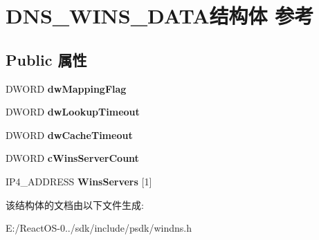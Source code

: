 \hypertarget{struct_d_n_s___w_i_n_s___d_a_t_a}{}\section{D\+N\+S\+\_\+\+W\+I\+N\+S\+\_\+\+D\+A\+T\+A结构体 参考}
\label{struct_d_n_s___w_i_n_s___d_a_t_a}
\subsection*{Public 属性}
\begin{DoxyCompactItemize}
\item 
\mbox{\label{struct_d_n_s___w_i_n_s___d_a_t_a_a3aa53dc4b38bb376aab4c39d67dcdb4d}} 
D\+W\+O\+RD {\bfseries dw\+Mapping\+Flag}
\item 
\mbox{\label{struct_d_n_s___w_i_n_s___d_a_t_a_a9b8215a75182c36eed884852e244803f}} 
D\+W\+O\+RD {\bfseries dw\+Lookup\+Timeout}
\item 
\mbox{\label{struct_d_n_s___w_i_n_s___d_a_t_a_a319edb31ccddf9cf262d04500b329c17}} 
D\+W\+O\+RD {\bfseries dw\+Cache\+Timeout}
\item 
\mbox{\label{struct_d_n_s___w_i_n_s___d_a_t_a_af7cdcdf60a4c5a3d028a69626fab49fc}} 
D\+W\+O\+RD {\bfseries c\+Wins\+Server\+Count}
\item 
\mbox{\label{struct_d_n_s___w_i_n_s___d_a_t_a_a84a6419b32a9b392c743755d3d4a23c9}} 
I\+P4\+\_\+\+A\+D\+D\+R\+E\+SS {\bfseries Wins\+Servers} \mbox{[}1\mbox{]}
\end{DoxyCompactItemize}


该结构体的文档由以下文件生成\+:\begin{DoxyCompactItemize}
\item 
E\+:/\+React\+O\+S-\/0../sdk/include/psdk/windns.\+h\end{DoxyCompactItemize}
